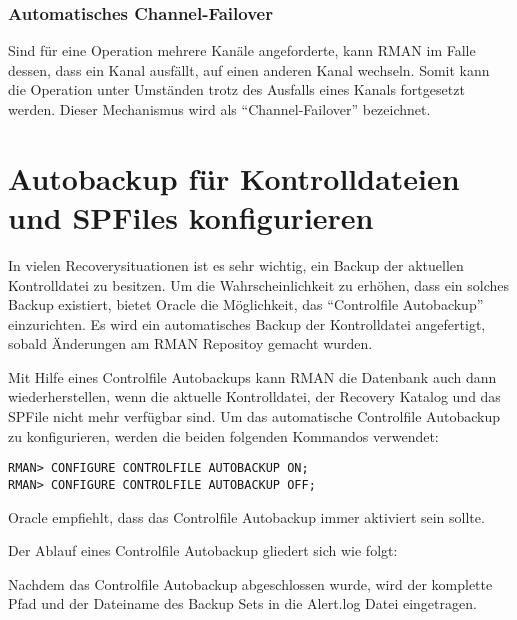         \subsubsection{Automatisches Channel-Failover}
          Sind f\"ur eine Operation mehrere Kan\"ale angeforderte, kann RMAN im Falle dessen, dass ein Kanal ausf\"allt, auf einen anderen Kanal wechseln. Somit kann die Operation unter Umst\"anden trotz des Ausfalls eines Kanals fortgesetzt werden. Dieser Mechanismus wird als \enquote{Channel-Failover} bezeichnet.
    \section{Autobackup f\"ur Kontrolldateien und SPFiles konfigurieren}
      \label{controlfileautobackup}
      In vielen Recoverysituationen ist es sehr wichtig, ein Backup der aktuellen Kontrolldatei zu besitzen. Um die Wahrscheinlichkeit zu erh\"ohen, dass ein solches Backup existiert, bietet Oracle die M\"oglichkeit, das \enquote{Controlfile Autobackup} einzurichten. Es wird ein automatisches Backup der Kontrolldatei angefertigt, sobald \"Anderungen am RMAN Repositoy gemacht wurden.

      Mit Hilfe eines Controlfile Autobackups kann RMAN die Datenbank auch dann wiederherstellen, wenn die aktuelle Kontrolldatei, der Recovery Katalog und das SPFile nicht mehr verf\"ugbar sind.  Um das automatische Controlfile Autobackup zu konfigurieren, werden die beiden folgenden Kommandos verwendet:
      \begin{lstlisting}[caption={Controlfile Autobackup konfigurieren},label=admin1024,language=rman]
RMAN> CONFIGURE CONTROLFILE AUTOBACKUP ON;
RMAN> CONFIGURE CONTROLFILE AUTOBACKUP OFF;
      \end{lstlisting}
      \begin{merke}
        Oracle empfiehlt, dass das Controlfile Autobackup immer aktiviert sein sollte.
      \end{merke}

      Der Ablauf eines Controlfile Autobackup gliedert sich wie folgt:

      Nachdem das Controlfile Autobackup abgeschlossen wurde, wird der komplette Pfad und der Dateiname des Backup Sets in die Alert.log Datei eingetragen.

